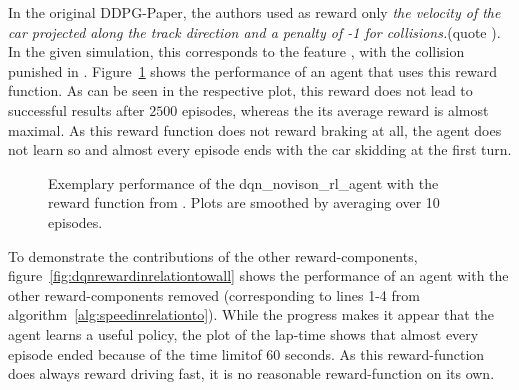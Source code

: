 In the original DDPG-Paper, the authors used as reward only \textit{the velocity of the car projected along the track direction and a penalty of -1 for collisions.}(quote \cite{lillicrap_continuous_2015}). In the given simulation, this corresponds to the feature , with the collision punished in . Figure~\ref{fig:dqnrewardspeedstuff} shows the performance of an agent that uses this reward function. 
As can be seen in the respective plot, this reward does not lead to successful results after $2500$ episodes, whereas the its average reward is almost maximal. As this reward function does not reward braking at all, the agent does not learn so and almost every episode ends with the car skidding at the first turn.


\begin{figure}[h]
	{%
		\setlength{\fboxsep}{0pt}%
		\setlength{\fboxrule}{1pt}%
	}%
	\centering
	\caption[Exemplary performance of the dqn\_novison\_rl\_agent with the reward function from \cite{lillicrap_continuous_2015}]{Exemplary performance of the dqn\_novison\_rl\_agent with the reward function from \cite{lillicrap_continuous_2015}. Plots are smoothed by averaging over 10 episodes.}
	\label{fig:dqnrewardspeedstuff}
\end{figure}


To demonstrate the contributions of the other reward-components, figure~\ref{fig:dqnrewardinrelationtowall} shows the performance of an agent with the other reward-components removed (corresponding to lines 1-4 from algorithm~\ref{alg:speedinrelationto}). While the progress makes it appear that the agent learns a useful policy, the plot of the lap-time shows that almost every episode ended because of the time limitof 60 seconds. As this reward-function does always reward driving fast, it is no reasonable reward-function on its own.
